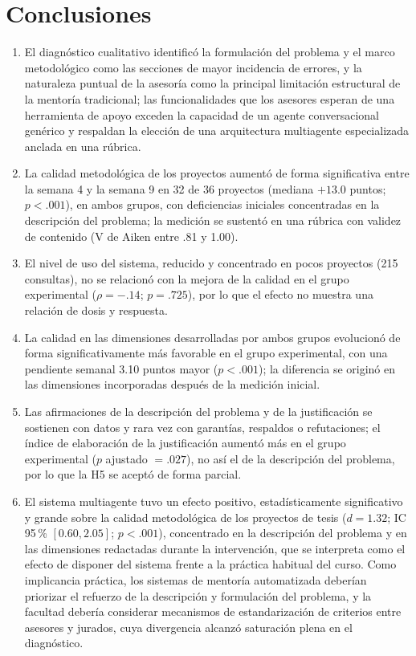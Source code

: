 \documentclass[journal]{IEEEtran}
\begin{document}
\section{Conclusiones}

\begin{enumerate}
\item El diagnóstico cualitativo identificó la formulación del problema y el marco metodológico como las secciones de mayor incidencia de errores, y la naturaleza puntual de la asesoría como la principal limitación estructural de la mentoría tradicional; las funcionalidades que los asesores esperan de una herramienta de apoyo exceden la capacidad de un agente conversacional genérico y respaldan la elección de una arquitectura multiagente especializada anclada en una rúbrica.
\item La calidad metodológica de los proyectos aumentó de forma significativa entre la semana 4 y la semana 9 en 32 de 36 proyectos (mediana $+13.0$ puntos; $p < .001$), en ambos grupos, con deficiencias iniciales concentradas en la descripción del problema; la medición se sustentó en una rúbrica con validez de contenido (V de Aiken entre .81 y 1.00).
\item El nivel de uso del sistema, reducido y concentrado en pocos proyectos (215 consultas), no se relacionó con la mejora de la calidad en el grupo experimental ($\rho = -.14$; $p = .725$), por lo que el efecto no muestra una relación de dosis y respuesta.
\item La calidad en las dimensiones desarrolladas por ambos grupos evolucionó de forma significativamente más favorable en el grupo experimental, con una pendiente semanal 3.10 puntos mayor ($p < .001$); la diferencia se originó en las dimensiones incorporadas después de la medición inicial.
\item Las afirmaciones de la descripción del problema y de la justificación se sostienen con datos y rara vez con garantías, respaldos o refutaciones; el índice de elaboración de la justificación aumentó más en el grupo experimental ($p$ ajustado $= .027$), no así el de la descripción del problema, por lo que la H5 se aceptó de forma parcial.
\item El sistema multiagente tuvo un efecto positivo, estadísticamente significativo y grande sobre la calidad metodológica de los proyectos de tesis ($d = 1.32$; IC 95\,\% $[0.60, 2.05]$; $p < .001$), concentrado en la descripción del problema y en las dimensiones redactadas durante la intervención, que se interpreta como el efecto de disponer del sistema frente a la práctica habitual del curso. Como implicancia práctica, los sistemas de mentoría automatizada deberían priorizar el refuerzo de la descripción y formulación del problema, y la facultad debería considerar mecanismos de estandarización de criterios entre asesores y jurados, cuya divergencia alcanzó saturación plena en el diagnóstico.
\end{enumerate}
\end{document}
